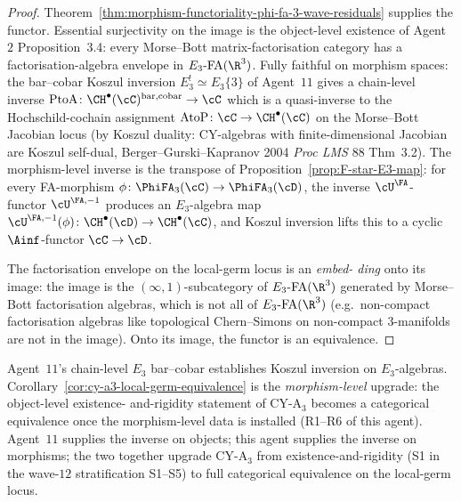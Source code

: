 \begin{proof}
Theorem~\ref{thm:morphism-functoriality-phi-fa-3-wave-residuals}
supplies the functor.  Essential surjectivity on the image is the
object-level existence of Agent~$2$ Proposition~3.4: every
Morse--Bott matrix-factorisation category has a factorisation-algebra
envelope in $E_3\text{-FA}(\R^3)$.  Fully faithful on morphism spaces:
the bar--cobar Koszul inversion $E_3^! \simeq E_3\{3\}$ of Agent~$11$
gives a chain-level inverse
$\mathrm{PtoA} \colon \CH^\bullet(\cC)^{\mathrm{bar},\mathrm{cobar}}
\to \cC$ which is a quasi-inverse to the Hochschild-cochain assignment
$\mathrm{AtoP} \colon \cC \to \CH^\bullet(\cC)$ on the Morse--Bott
Jacobian locus (by Koszul duality: CY-algebras with finite-dimensional
Jacobian are Koszul self-dual, Berger--Gurski--Kapranov 2004
\emph{Proc LMS} 88 Thm~3.2).  The morphism-level inverse is the
transpose of Proposition~\ref{prop:F-star-E3-map}: for every FA-morphism
$\phi \colon \PhiFA_3(\cC) \to \PhiFA_3(\cD)$, the inverse $\cU^\FA$-
functor $\cU^{\FA, -1}$ produces an $E_3$-algebra map
$\cU^{\FA, -1}(\phi) \colon \CH^\bullet(\cD) \to \CH^\bullet(\cC)$,
and Koszul inversion lifts this to a cyclic $\Ainf$-functor
$\cC \to \cD$.

The factorisation envelope on the local-germ locus is an \emph{embed-
ding} onto its image: the image is the $(\infty,1)$-subcategory of
$E_3\text{-FA}(\R^3)$ generated by Morse--Bott factorisation algebras,
which is not all of $E_3\text{-FA}(\R^3)$ (e.g.\ non-compact
factorisation algebras like topological Chern--Simons on non-compact
$3$-manifolds are not in the image).  Onto its image, the functor is
an equivalence.
\end{proof}

\begin{remark}
\label{rem:relation-agent-11-koszul}
Agent~$11$'s chain-level $E_3$ bar--cobar establishes Koszul
inversion on $E_3$-algebras.  Corollary~\ref{cor:cy-a3-local-germ-equivalence}
is the \emph{morphism-level} upgrade: the object-level existence-
and-rigidity statement of CY-A$_3$ becomes a categorical equivalence
once the morphism-level data is installed (R1--R6 of this agent).
Agent~$11$ supplies the inverse on objects; this agent supplies the
inverse on morphisms; the two together upgrade CY-A$_3$ from
existence-and-rigidity (S1 in the wave-$12$ stratification S1--S5) to
full categorical equivalence on the local-germ locus.
\end{remark}

